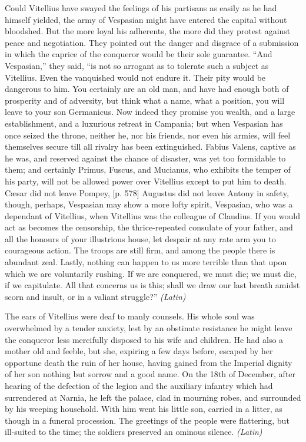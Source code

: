 Could Vitellius have swayed the feelings of his partisans as easily as he had himself yielded, the army of Vespasian might have entered the capital without bloodshed. But the more loyal his adherents, the more did they protest against peace and negotiation. They pointed out the danger and disgrace of a submission in which the caprice of the conqueror would be their sole guarantee. ``And Vespasian,'' they said, ``is not so arrogant as to tolerate such a subject as Vitellius. Even the vanquished would not endure it. Their pity would be dangerous to him. You certainly are an old man, and have had enough both of prosperity and of adversity, but think what a name, what a position, you will leave to your son Germanicus. Now indeed they promise you wealth, and a large establishment, and a luxurious retreat in Campania; but when Vespasian has once seized the throne, neither he, nor his friends, nor even his armies, will feel themselves secure till all rivalry has been extinguished. Fabius Valens, captive as he was, and reserved against the chance of disaster, was yet too formidable to them; and certainly Primus, Fuscus, and Mucianus, who exhibits the temper of his party, will not be allowed power over Vitellius except to put him to death. Cæsar did not leave Pompey, [p. 578] Augustus did not leave Antony in safety, though, perhaps, Vespasian may show a more lofty spirit, Vespasian, who was a dependant of Vitellius, when Vitellius was the colleague of Claudius. If you would act as becomes the censorship, the thrice-repeated consulate of your father, and all the honours of your illustrious house, let despair at any rate arm you to courageous action. The troops are still firm, and among the people there is abundant zeal. Lastly, nothing can happen to us more terrible than that upon which we are voluntarily rushing. If we are conquered, we must die; we must die, if we capitulate. All that concerns us is this; shall we draw our last breath amidst scorn and insult, or in a valiant struggle?'' \emph{(Latin)}


The ears of Vitellius were deaf to manly counsels. His whole soul was overwhelmed by a tender anxiety, lest by an obstinate resistance he might leave the conqueror less mercifully disposed to his wife and children. He had also a mother old and feeble, but she, expiring a few days before, escaped by her opportune death the ruin of her house, having gained from the Imperial dignity of her son nothing but sorrow and a good name. On the 18th of December, after hearing of the defection of the legion and the auxiliary infantry which had surrendered at Narnia, he left the palace, clad in mourning robes, and surrounded by his weeping household. With him went his little son, carried in a litter, as though in a funeral procession. The greetings of the people were flattering, but ill-suited to the time; the soldiers preserved an ominous silence. \emph{(Latin)}

